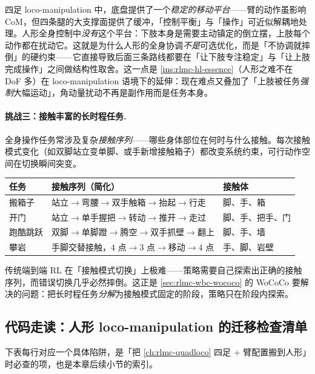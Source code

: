 \begin{insight}\label{ins:rlmc-wbc-platform}
四足 loco-manipulation 中，底盘提供了一个\emph{稳定的移动平台}——臂的动作虽影响 CoM，但四条腿的大支撑面提供了缓冲，「控制平衡」与「操作」可近似解耦地处理。人形全身控制中\emph{没有}这个平台：下肢本身是需要主动镇定的倒立摆，上肢每个动作都在扰动它。这就是为什么人形的全身协调\emph{不是}可选优化，而是「不协调就摔倒」的硬约束——它直接导致后面三条路线都要在「让下肢专注稳定」与「让上肢完成操作」之间做结构性取舍。这一点是 \cref{ins:rlmc-hl-essence}（人形之难不在 DoF 多）在 loco-manipulation 语境下的延伸：现在难点又叠加了「上肢被任务\emph{强制}大幅运动」，角动量扰动不再是副作用而是任务本身。
\end{insight}

\paragraph{挑战三：接触丰富的长时程任务.}
全身操作任务常涉及复杂\emph{接触序列}——哪些身体部位在何时与什么接触。每次接触模式变化（如双脚站立变单脚、或手新增接触箱子）都改变系统约束，可行动作空间在切换瞬间突变。

\begin{center}
\small
\begin{tabular}{lll}
\hline
任务 & 接触序列（简化） & 接触体 \\
\hline
搬箱子 & 站立$\to$弯腰$\to$双手触箱$\to$抬起$\to$行走 & 脚、手、箱 \\
开门 & 站立$\to$单手握把$\to$转动$\to$推开$\to$走过 & 脚、手、把手、门 \\
跑酷跳跃 & 双脚$\to$单脚蹬$\to$腾空$\to$双手抓壁$\to$翻上 & 脚、手、墙 \\
攀岩 & 手脚交替接触，$4$ 点$\to$$3$ 点$\to$移动$\to$$4$ 点 & 手、脚、岩壁 \\
\hline
\end{tabular}
\end{center}

传统端到端 RL 在「接触模式切换」上极难——策略需要自己探索出正确的接触序列，而错误切换几乎必然摔倒。这正是 \cref{sec:rlmc-wbc-wococo} 的 WoCoCo 要解决的问题：把长时程任务\emph{分解}为接触模式固定的阶段，策略只在阶段内探索。

\subsection{代码走读：人形 loco-manipulation 的迁移检查清单}
下表每行对应一个具体陷阱，是「把 \cref{ch:rlmc-quadloco} 四足 $+$ 臂配置搬到人形」时必查的项，也是本章后续小节的索引。

